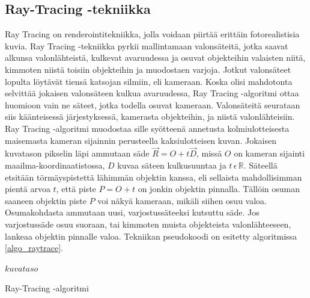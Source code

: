 \documentclass[a4paper,12pt, titlepage]{article}
\theoremstyle{break}
\newcommand{\R}{\mathbb{R}}
\begin{document}
\subsection{Ray-Tracing -tekniikka}

Ray Tracing on renderointitekniikka, jolla voidaan piirtää erittäin fotorealistisia kuvia. Ray Tracing -tekniikka pyrkii mallintamaan valonsäteitä, jotka saavat alkunsa valonlähteistä, kulkevat avaruudessa ja osuvat objekteihin valaisten niitä, kimmoten niistä toisiin objekteihin ja muodostaen varjoja. Jotkut valonsäteet lopulta löytävät tiensä katsojan silmiin, eli kameraan. Koska olisi mahdotonta selvittää jokaisen valonsäteen kulkua avaruudessa, Ray Tracing -algoritmi ottaa huomioon vain ne säteet, jotka todella osuvat kameraan. Valonsäteitä seurataan siis käänteisessä järjestyksessä, kamerasta objekteihin, ja niistä valonlähteisiin.\cite{janke}\\

Ray Tracing -algoritmi muodostaa sille syötteenä annetusta kolmiulotteisesta maisemasta kameran sijainnin perusteella kaksiulotteisen kuvan. Jokaisen kuvatason pikselin läpi ammutaan säde $\vec{R}=O+t\vec{D}$, missä $O$ on kameran sijainti maailma-koordinaatistossa, $D$ kuvaa säteen kulkusuuntaa ja $t\,\epsilon\,\R$. Säteellä etsitään törmäyspistettä lähimmän objektin kanssa, eli sellaista mahdollisimman pientä arvoa $t$, että piste $P=O+t$ on jonkin objektin pinnalla. Tällöin osuman saaneen objektin piste $P$ voi näkyä kameraan, mikäli siihen osuu valoa. Osumakohdasta ammutaan uusi, varjostussäteeksi kutsuttu säde. Jos varjostussäde osuu suoraan, tai kimmoten muista objekteista valonlähteeseen, lankeaa objektin pinnalle valoa. Tekniikan pseudokoodi on esitetty algoritmissa \ref{algo_raytrace}.\cite{janke}\\

\begin{algorithm}
\KwRet $kuvataso$
\caption{Ray-Tracing -algoritmi}\label{algo_raytrace}
\end{algorithm}
\end{document}
